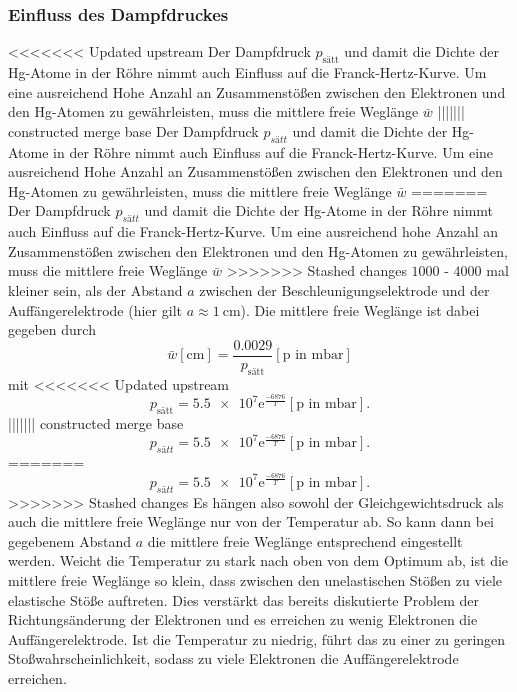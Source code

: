 \subsubsection*{Einfluss des Dampfdruckes}
<<<<<<< Updated upstream
Der Dampfdruck $p_\text{sätt}$ und damit die Dichte der Hg-Atome in der Röhre nimmt auch Einfluss auf die Franck-Hertz-Kurve. Um eine ausreichend
Hohe Anzahl an Zusammenstößen zwischen den Elektronen und den Hg-Atomen zu gewährleisten, muss die mittlere freie Weglänge $\bar{w}$
||||||| constructed merge base
Der Dampfdruck $p_{sätt}$ und damit die Dichte der Hg-Atome in der Röhre nimmt auch Einfluss auf die Franck-Hertz-Kurve. Um eine ausreichend
Hohe Anzahl an Zusammenstößen zwischen den Elektronen und den Hg-Atomen zu gewährleisten, muss die mittlere freie Weglänge $\bar{w}$
=======
Der Dampfdruck $p_{sätt}$ und damit die Dichte der Hg-Atome in der Röhre nimmt auch Einfluss auf die Franck-Hertz-Kurve. Um eine ausreichend
hohe Anzahl an Zusammenstößen zwischen den Elektronen und den Hg-Atomen zu gewährleisten, muss die mittlere freie Weglänge $\bar{w}$
>>>>>>> Stashed changes
$\num{1000}$ - $\num{4000}$ mal kleiner sein, als der Abstand $a$ zwischen der Beschleunigungselektrode und der Auffängerelektrode (hier gilt
$a\approx\SI{1}{\centi\metre}$). Die mittlere freie Weglänge ist dabei gegeben durch
\begin{equation}
    \bar{w}[\si{\centi\metre}]=\frac{\num{0.0029}}{p_\text{sätt}} [\text{p in } \si{\milli\bar}]
    \label{eqn:freieweglaengetheorie}
\end{equation}
mit
<<<<<<< Updated upstream
\begin{equation*}
    p_\text{sätt}=\num{5.5e7}\text{e}^{\frac{-6876}{T}} [\text{p in }\si{\milli\bar}] .
\end{equation*}
||||||| constructed merge base
\begin{equation*}
    p_{sätt}=\num{5.5e7}\text{e}^{\frac{-6876}{T}} [\text{p in }\si{\milli\bar}] .
\end{equation*}
=======
\begin{equation}
    p_{sätt}=\num{5.5e7}\text{e}^{\frac{-6876}{T}} [\text{p in }\si{\milli\bar}] .
    \label{eqn:sättigungsdampfdrtheorie}
\end{equation}
>>>>>>> Stashed changes
Es hängen also sowohl der Gleichgewichtsdruck als auch die mittlere freie Weglänge nur von der Temperatur ab. So kann dann bei gegebenem
Abstand $a$ die mittlere freie Weglänge entsprechend eingestellt werden. Weicht die Temperatur zu stark nach oben von dem Optimum ab, ist die
mittlere freie Weglänge so klein, dass zwischen den unelastischen Stößen zu viele elastische Stöße auftreten. Dies verstärkt das bereits
diskutierte Problem der Richtungsänderung der Elektronen und es erreichen zu wenig Elektronen die Auffängerelektrode. Ist die Temperatur zu
niedrig, führt das zu einer zu geringen Stoßwahrscheinlichkeit, sodass zu viele Elektronen die Auffängerelektrode erreichen.

